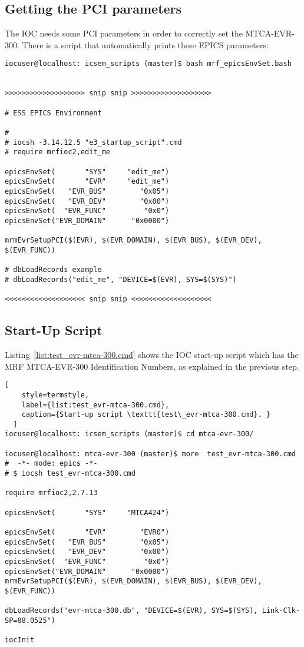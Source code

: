 \documentclass[11pt
  , a4paper
  , article
  , oneside
  , showtrims
]{memoir}
\begin{document}
\subsection{Getting the PCI parameters}
The IOC needs some PCI parameters in order to correctly set the MTCA-EVR-300. There is a script that automatically prints these EPICS parameters: 
\begin{lstlisting}[style=termstyle]
iocuser@localhost: icsem_scripts (master)$ bash mrf_epicsEnvSet.bash 


>>>>>>>>>>>>>>>>>>> snip snip >>>>>>>>>>>>>>>>>>>

# ESS EPICS Environment

#
# iocsh -3.14.12.5 "e3_startup_script".cmd
# require mrfioc2,edit_me

epicsEnvSet(       "SYS"     "edit_me")
epicsEnvSet(       "EVR"     "edit_me")
epicsEnvSet(   "EVR_BUS"        "0x05")
epicsEnvSet(   "EVR_DEV"        "0x00")
epicsEnvSet(  "EVR_FUNC"         "0x0")
epicsEnvSet("EVR_DOMAIN"      "0x0000")

mrmEvrSetupPCI($(EVR), $(EVR_DOMAIN), $(EVR_BUS), $(EVR_DEV), $(EVR_FUNC))

# dbLoadRecords example
# dbLoadRecords("edit_me", "DEVICE=$(EVR), SYS=$(SYS)")

<<<<<<<<<<<<<<<<<<< snip snip <<<<<<<<<<<<<<<<<<<
\end{lstlisting} 


\subsection{Start-Up Script}
Listing~\ref{list:test_evr-mtca-300.cmd} shows the IOC start-up script which has the MRF MTCA-EVR-300 Identification Numbers, as explained in the previous step.

\begin{lstlisting}[
    style=termstyle,
    label={list:test_evr-mtca-300.cmd},
    caption={Start-up script \texttt{test\_evr-mtca-300.cmd}. }
  ]
iocuser@localhost: icsem_scripts (master)$ cd mtca-evr-300/

iocuser@localhost: mtca-evr-300 (master)$ more  test_evr-mtca-300.cmd
#  -*- mode: epics -*-
# $ iocsh test_evr-mtca-300.cmd

require mrfioc2,2.7.13

epicsEnvSet(       "SYS"     "MTCA424")

epicsEnvSet(       "EVR"        "EVR0")
epicsEnvSet(   "EVR_BUS"        "0x05")
epicsEnvSet(   "EVR_DEV"        "0x00")
epicsEnvSet(  "EVR_FUNC"         "0x0")
epicsEnvSet("EVR_DOMAIN"      "0x0000")
mrmEvrSetupPCI($(EVR), $(EVR_DOMAIN), $(EVR_BUS), $(EVR_DEV), $(EVR_FUNC))

dbLoadRecords("evr-mtca-300.db", "DEVICE=$(EVR), SYS=$(SYS), Link-Clk-SP=88.0525")

iocInit
\end{lstlisting}
\end{document}
